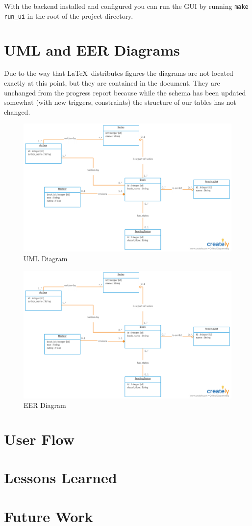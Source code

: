 \documentclass{article}
\begin{document}
With the backend installed and configured you can run the GUI
by running \texttt{make run\_ui} in the root of the project directory.

\section*{UML and EER Diagrams}

Due to the way that \LaTeX \ distributes figures
the diagrams are not located exactly at this point,
but they are contained in the document.
They are unchanged from the progress report
because while the schema has been updated somewhat
(with new triggers, constraints)
the structure of our tables has not changed.

\begin{figure}[h]
  \centering
  \includegraphics[width=\textwidth]{uml}
  \caption{UML Diagram}
\end{figure}

\begin{figure}[h]
  \centering
  \includegraphics[width=\textwidth]{uml}
  \caption{EER Diagram}
\end{figure}

\section*{User Flow}


\section*{Lessons Learned}

\section*{Future Work}
\end{document}
